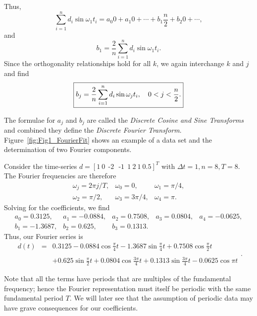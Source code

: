 Thus,
\begin{equation}
\displaystyle \sum^n_{i=1} d_i \sin \omega_1 t_i = a_0 0 + a_1 0  + \cdots + b_1 \frac{n}{2} + b_2 0 + \cdots,
\end{equation}
and
\begin{equation}
b_1 = \frac{2}{n} \sum^n_{i=1} d_i \sin \omega_1 t_i.
\end{equation}
Since the orthogonality relationships hold for all $k$, we again interchange $k$ and $j$ and find
\begin{equation}
	\index{Discrete sine transform}
	\label{eq:DST}
\boxed{b_j = \frac{2}{n} \sum^n_{i=1} d_i \sin \omega_j t_i, \quad 0 < j < \frac{n}{2}.}
\end{equation}

The formulae for $a_j$ and $b_j$ are called the \emph{Discrete Cosine and Sine Transforms} and combined they
define the \emph{Discrete Fourier Transform}. Figure~\ref{fig:Fig1_FourierFit} shows an
example of a data set and the determination of two Fourier components.
\begin{example}
Consider the time-series $d = [ 1 \ 0 \ \ \mbox{-2} \  \ \ \mbox{-1} \ \ 1 \ 2 \ 1 \ 0.5 ]^T$   with 
$\Delta t = 1, n = 8, T = 8$.  The Fourier frequencies are therefore
\begin{equation}
\begin{array}{lll}
\omega_j = 2 \pi j /T, & \omega_0 = 0, & \omega_1 = \pi/4, \\
\omega_2 = \pi/2,  & \omega_3 = 3 \pi/4, & \omega_4 = \pi.
\end{array}
\end{equation}
Solving for the coefficients, we find
\begin{equation} \begin{array}{lllll}
a_0 = 0.3125, & a_1 = -0.0884, & a_2 = 0.7508, & a_3 = 0.0804, & a_4 = -0.0625, \\
b_1 = -1.3687, & b_2 = 0.625, & b_3 = 0.1313.
\end{array}
\end{equation}
Thus, our Fourier series is
\begin{equation}
\begin{array}{lll}
d(t)&  = &  \displaystyle 0.3125 - 0.0884 \cos \frac{\pi}{4} t -1.3687 \sin \frac{\pi}{4} t + 0.7508 \cos  \frac{\pi}{2} t\\\\[2pt]
&  & + \displaystyle  0.625 \sin \frac{\pi}{2}t  + 0.0804 \cos \frac{3 \pi}{4}t + 0.1313 \sin \frac{3 \pi}{4} t - 0.0625 \cos \pi t \end{array}.
\end{equation}
\end{example}
Note that all the terms have periods that are multiples of the fundamental frequency; hence the 
Fourier representation must itself be periodic with the same fundamental period $T$.  We will later 
see that the assumption of periodic data may have grave consequences for our coefficients.

